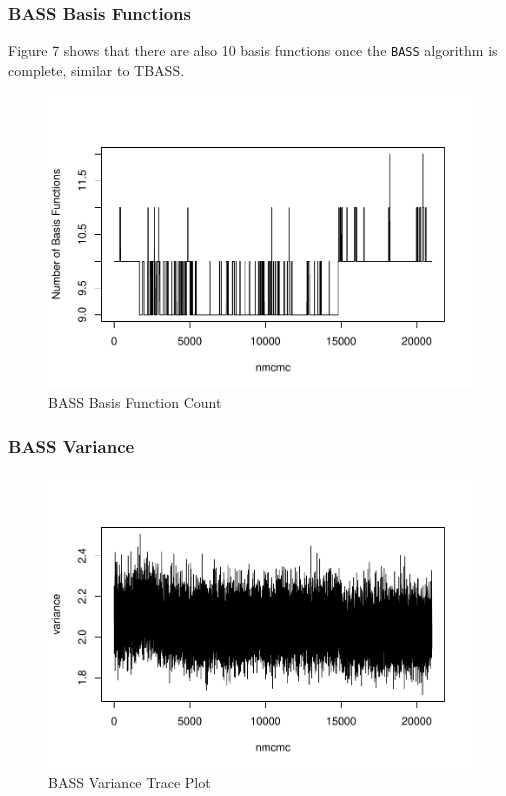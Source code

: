 \documentclass[
]{article}
\begin{document}
\hypertarget{bass-basis-functions}{%
\subsubsection{BASS Basis Functions}\label{bass-basis-functions}}

Figure 7 shows that there are also 10 basis functions once the
\texttt{BASS} algorithm is complete, similar to TBASS.

\begin{figure}
\centering
\includegraphics{TBASS_vig_files/figure-latex/unnamed-chunk-17-1.pdf}
\caption{BASS Basis Function Count}
\end{figure}

\hypertarget{bass-variance}{%
\subsubsection{BASS Variance}\label{bass-variance}}

\begin{figure}
\centering
\includegraphics{TBASS_vig_files/figure-latex/unnamed-chunk-18-1.pdf}
\caption{BASS Variance Trace Plot}
\end{figure}
\end{document}
